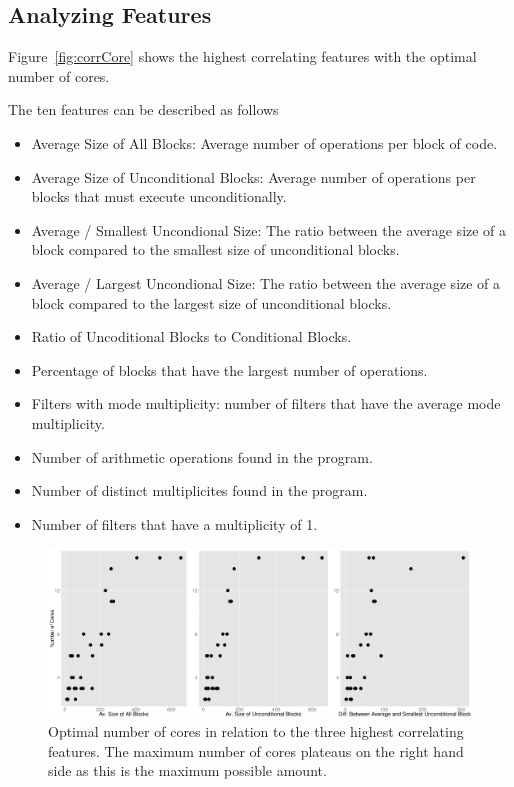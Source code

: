 \subsection{Analyzing Features}

Figure~\ref{fig:corrCore} shows the highest correlating features with the optimal number of cores.

The ten features can be described as follows
\begin{itemize}
\item Average Size of All Blocks: Average number of operations per block of code.
\vspace{-1em}
\item Average Size of Unconditional Blocks: Average number of operations per blocks that must execute unconditionally.
\vspace{-1em}
\item Average / Smallest Uncondional Size: The ratio between the average size of a block compared to the smallest size of unconditional blocks.
\vspace{-1em}
\item Average / Largest Uncondional Size: The ratio between the average size of a block compared to the largest size of unconditional blocks.
\vspace{-1em}
\item Ratio of Uncoditional Blocks to Conditional Blocks.
\vspace{-1em}
\item Percentage of blocks that have the largest number of operations.
\vspace{-1em}
\item Filters with mode multiplicity: number of filters that have the average mode multiplicity.
\vspace{-1em}
\item Number of arithmetic operations found in the program.
\vspace{-1em}
\item Number of distinct multiplicites found in the program.
\vspace{-1em}
\item Number of filters that have a multiplicity of 1.
\end{itemize}

\begin{figure}[h]
  \center
  \includegraphics[width=1\textwidth]{streamit-paper/graphics/lineargraphs.pdf}
  \caption{Optimal number of cores in relation to the three highest correlating features. The maximum number of cores plateaus on the right hand side as this is the maximum possible amount.}\label{fig:maxav}
\end{figure}

